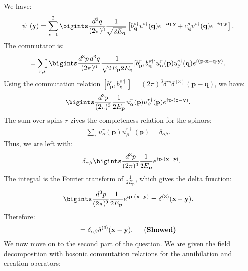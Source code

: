 {We have:
\begin{align*}
    \psi^\dagger(\mathbf{y}) = \sum_{s=1}^2 \bigints\frac{d^3q}{(2\pi)^3} \frac{1}{\sqrt{2E_{\mathbf{q}}}} \left[ b^{s\dagger}_{\mathbf{q}} u^{s\dagger}(\mathbf{q}) e^{-i\mathbf{q}\cdot\mathbf{y}} + c^s_{\mathbf{q}} v^{s\dagger}(\mathbf{q}) e^{+i\mathbf{q}\cdot\mathbf{y}} \right].
\end{align*}
The commutator is:
\begin{align}
    [\psi_\alpha(\mathbf{x}), \psi^\dagger_\beta(\mathbf{y})] = \sum_{r,s} \bigints\frac{d^3p \, d^3q}{(2\pi)^6} \frac{1}{\sqrt{2E_{\mathbf{p}} 2E_{\mathbf{q}}}} [b^r_{\mathbf{p}}, b^{s\dagger}_{\mathbf{q}}] u^r_\alpha(\mathbf{p}) u^{s\dagger}_\beta(\mathbf{q}) e^{i(\mathbf{p}\cdot\mathbf{x} - \mathbf{q}\cdot\mathbf{y})}.
\end{align}
Using the commutation relation $[b^r_{\mathbf{p}}, b^{s\dagger}_{\mathbf{q}}] = (2\pi)^3 \delta^{rs} \delta^{(3)}(\mathbf{p} - \mathbf{q})$, we have:
\begin{align*}
    \bigints\frac{d^3p}{(2\pi)^3} \frac{1}{2E_{\mathbf{p}}} u^r_\alpha(\mathbf{p}) u^{r\dagger}_\beta(\mathbf{p}) e^{i\mathbf{p}\cdot(\mathbf{x} - \mathbf{y})}.
\end{align*}
The sum over spins $r$ gives the completeness relation for the spinors:
\begin{align*}
    \sum_r u^r_\alpha(\mathbf{p}) u^{r\dagger}_\beta(\mathbf{p}) = \delta_{\alpha\beta}.
\end{align*}
Thus, we are left with:
\begin{align*}
    [\psi_\alpha(\mathbf{x}), \psi^\dagger_\beta(\mathbf{y})] = \delta_{\alpha\beta} \bigints\frac{d^3p}{(2\pi)^3} \frac{1}{2E_{\mathbf{p}}} e^{i\mathbf{p}\cdot(\mathbf{x} - \mathbf{y})}.
\end{align*}
The integral is the Fourier transform of $\displaystyle\frac{1}{2E_{\mathbf{p}}}$, which gives the delta function:
\begin{align*}
    \bigints\frac{d^3p}{(2\pi)^3} \frac{1}{2E_{\mathbf{p}}} e^{i\mathbf{p}\cdot(\mathbf{x} - \mathbf{y})} = \delta^{(3)}(\mathbf{x} - \mathbf{y}).
\end{align*}
Therefore:
\begin{align}
    [\psi_\alpha(\mathbf{x}), \psi^\dagger_\beta(\mathbf{y})] = \delta_{\alpha\beta} \delta^{(3)}(\mathbf{x} - \mathbf{y}).~~~~~\text{(\bf Showed)}
\end{align}
We now move on to the second part of the question. We are given the field decomposition with bosonic commutation relations for the annihilation and creation operators:
}

